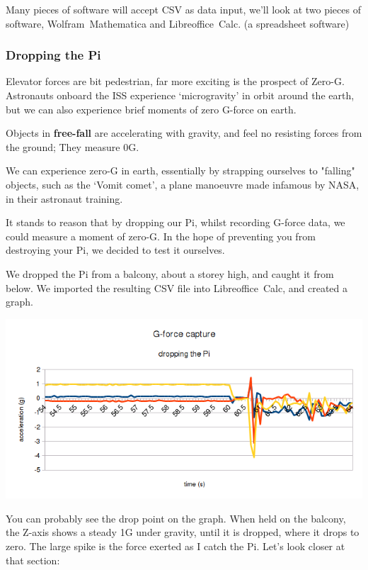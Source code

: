 	Many pieces of software will accept CSV as data input, we'll look at two pieces of software, \mbox{Wolfram Mathematica} and \mbox{Libreoffice Calc}. (a spreadsheet software)
	
	\subsubsection*{Dropping the Pi}
	
	Elevator forces are bit pedestrian, far more exciting is the prospect of Zero-G. Astronauts onboard the ISS experience `microgravity' in orbit around the earth, but we can also experience brief moments of zero G-force on earth.
	
	\begin{aside}
		Objects in \textbf{free-fall} are accelerating with gravity, and feel no resisting forces from the ground; They measure 0G.
		
		We can experience zero-G in earth, essentially by strapping ourselves to "falling" objects, such as the `Vomit comet', a plane manoeuvre made infamous by NASA, in their astronaut training.
	\end{aside}
	
	It stands to reason that by dropping our Pi, whilst recording G-force data, we could measure a moment of zero-G. In the hope of preventing you from destroying your Pi, we decided to test it ourselves.
	
	We dropped the Pi from a balcony, about a storey high, and caught it from below. We imported the resulting CSV file into \mbox{Libreoffice Calc}, and created a graph.
	
	\begin{center}
		\includegraphics[width=1\linewidth]{McrRaspJam/008_SenseHAT/img/graph_whole}
	\end{center}
	
	You can probably see the drop point on the graph. When held on the balcony, the Z-axis shows a steady 1G under gravity, until it is dropped, where it drops to zero. The large spike is the force exerted as I catch the Pi. Let's look closer at that section:
	
